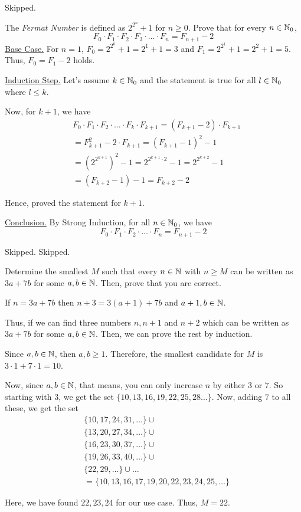 \bp Skipped.\ep

\bp 
The \emph{Fermat Number} is defined as $2^{2^n} + 1$ for $n \geq 0$. Prove that for every $n \in \mathbb{N}_0$,
$$F_0 \cdot F_1 \cdot F_2 \cdot F_3 \cdot \ldots \cdot F_n = F_{n+1} - 2$$
\ep
\bs
\underline{Base Case.} For $n = 1$, $F_0 = 2^{2^0} + 1 = 2^1 + 1 = 3$ and $F_1 = 2^{2^1} + 1 = 2^2 + 1 = 5$. Thus, $F_0 = F_1 - 2$ holds.

\underline{Induction Step.} Let's assume $k \in \mathbb{N}_0$ and the statement is true for all $l \in \mathbb{N}_0$ where $l \leq k$. 

Now, for $k+1$, we have
\begin{align*}
	&F_0 \cdot F_1 \cdot F_2 \cdot \ldots \cdot F_k \cdot F_{k+1} 
		= (F_{k+1} - 2) \cdot F_{k+1} \\
	&= F_{k+1}^2 - 2 \cdot F_{k+1} 
		= (F_{k+1} - 1)^2 - 1 \\
	&= (2^{2^{k+1}})^2 - 1
		= 2^{2^{k+1} \cdot 2} - 1 = 2^{2^{k+2}} - 1 \\
	&= (F_{k+2} - 1) - 1
		= F_{k+2} - 2
\end{align*}

Hence, proved the statement for $k+1$.

\underline{Conclusion.} By Strong Induction, for all $n \in \mathbb{N}_0$, we have
$$F_0 \cdot F_1 \cdot F_2 \cdot \ldots \cdot F_n = F_{n+1} - 2$$
\es


\bp Skipped. \ep
\bp Skipped. \ep

\bp Determine the smallest $M$ such that every $n \in \mathbb{N}$ with $n \geq M$ can be written as $3a + 7b$ for some $a, b \in \mathbb{N}$. Then, prove that you are correct. \ep

\begin{scratch}
	If $n = 3a+7b$ then $n+3 = 3(a+1)+7b$ and $a+1, b \in \mathbb{N}$.

	Thus, if we can find three numbers $n, n+1$ and $n+2$ which can be written as $3a+7b$ for some $a, b \in \mathbb{N}$. Then, we can prove the rest by induction.

	Since $a, b \in \mathbb{N}$, then $a, b \geq 1$. Therefore, the smallest candidate for $M$ is $3 \cdot 1 + 7 \cdot 1 = 10$.

	Now, since $a, b \in \mathbb{N}$, that means, you can only increase $n$ by either $3$ or $7$. So starting with $3$, we get the set $\{10, 13, 16, 19, 22, 25, 28...\}$. Now, adding $7$ to all these, we get the set 
	\begin{align*}
	&\{10, 17, 24, 31, \ldots \} \cup \\
	&\{13, 20, 27, 34, \ldots \} \cup \\
	&\{16, 23, 30, 37, \ldots \} \cup \\
	&\{19, 26, 33, 40, \ldots \} \cup \\
	&\{22, 29, \ldots \} \cup \ldots \\
	&= \{10, 13, 16, 17, 19, 20, 22, 23, 24, 25, \ldots \}
	\end{align*}

	Here, we have found $22, 23, 24$ for our use case. Thus, $M = 22$.

\end{scratch}

